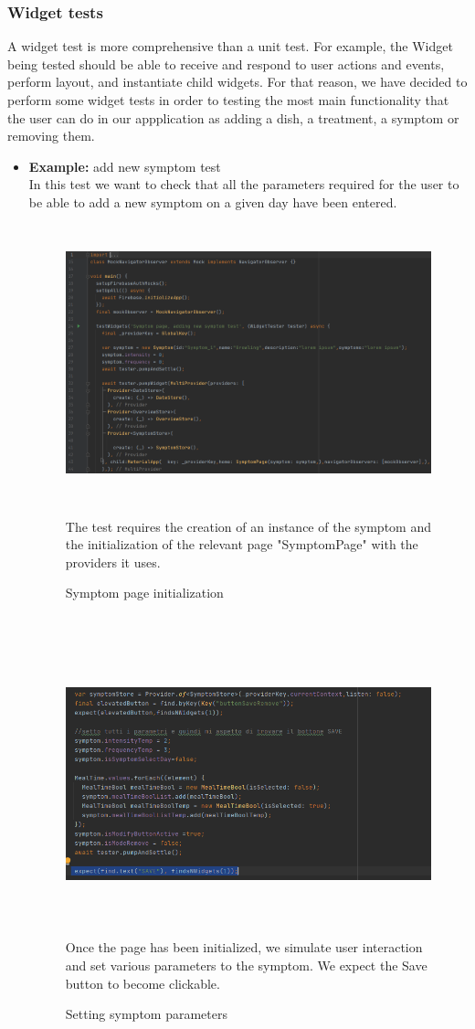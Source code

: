 \documentclass [12pt]{article}
\begin{document}
\subsubsection{Widget tests}
A widget test is more comprehensive than a unit test.
For example, the Widget being tested should be able to receive and respond to user actions and events, perform layout, and instantiate child widgets. For that reason, we have decided to perform some widget tests in order to testing the most main  functionality that the user can do in our appplication as adding a dish, a treatment, a symptom or removing them.
\begin{itemize}[•]
\item \textbf{Example:} add new symptom test\\
In this test we want to check that all the parameters required for the user to be able to add a new symptom on a given day have been entered. 
\begin{figure}[h!]
\centering
\includegraphics[width=\linewidth,height=8cm]{inizializzareSymptomPage.PNG}
\caption{Symptom page initialization}
\medskip
\small
The test requires the creation of an instance of the symptom and the initialization of the relevant page "SymptomPage" with the providers it uses.
\end{figure}
\\


\begin{figure}[h!]
\centering
\includegraphics[width=\linewidth,height=8cm]{symptomButtonSave.PNG}
\caption{Setting symptom parameters}
\medskip
\small
Once the page has been initialized, we simulate user interaction and set various parameters to the symptom. We expect the Save button to become clickable.
\end{figure}


\end{itemize}
\end{document}
